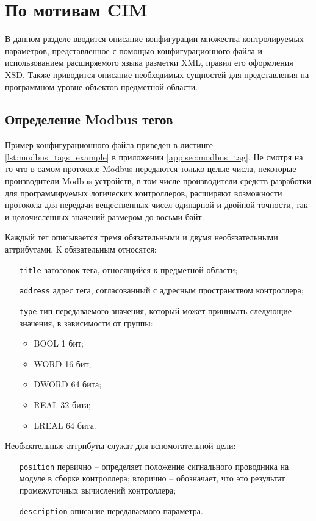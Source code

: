 \chapter{По мотивам CIM}

В данном разделе вводится описание конфигурации множества контролируемых параметров,
представленное с помощью конфигурационного файла и использованием расширяемого языка разметки XML, правил его оформления XSD.
Также приводится описание необходимых сущностей для представления
на программном уровне объектов предметной области.


\section{Определение Modbus тегов} \label{sec:modbus_tag}
Пример конфигурационного файла приведен в листинге \ref{lst:modbus_tags_example} в приложении \ref{app:sec:modbus_tag}.
Не смотря на то что в самом протоколе Modbus передаются только целые числа, некоторые производители Modbus-устройств,
в том числе производители средств разработки для программируемых логических контроллеров, расширяют возможности протокола
для передачи вещественных чисел одинарной и двойной точности, так и целочисленных значений размером до восьми байт.

Каждый тег описывается тремя обязательными и двумя необязательными аттрибутами.
К обязательным относятся:
\begin{itemize}
    \item[\texttt{title}] заголовок тега, относящийся к предметной области;
    \item[\texttt{address}] адрес тега, согласованный с адресным пространством контроллера;
    \item[\texttt{type}] тип передаваемого значения, который может принимать следующие значения, в зависимости от группы:
    \begin{itemize}
        \item BOOL 1 бит;
        \item WORD 16 бит;
        \item DWORD 64 бита;
        \item REAL 32 бита;
        \item LREAL 64 бита.
    \end{itemize}
\end{itemize}
Необязательные аттрибуты служат для вспомогательной цели:
\begin{itemize}
    \item[\texttt{position}] первично -- определяет положение сигнального проводника на модуле в сборке контроллера;
    вторично -- обозначает, что это результат промежуточных вычислений контроллера;
    \item[\texttt{description}] описание передаваемого параметра.
\end{itemize}




